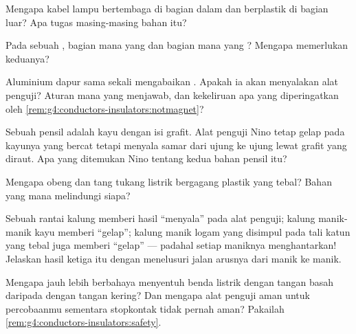 \begin{exercise}[$\star$]\label{exo:g4:conductors-insulators:5}
Mengapa kabel lampu bertembaga di bagian dalam dan berplastik di
bagian luar? Apa tugas masing-masing bahan itu?
\end{exercise}

\begin{exercise}[$\star$]\label{exo:g4:conductors-insulators:6}
Pada sebuah , bagian mana yang  dan bagian mana yang
? Mengapa  memerlukan keduanya?
\end{exercise}

\begin{exercise}[$\star$]\label{exo:g4:conductors-insulators:7}
Aluminium dapur sama sekali mengabaikan . Apakah ia akan
menyalakan  alat penguji? Aturan mana yang menjawab, dan
kekeliruan apa yang diperingatkan oleh
\cref{rem:g4:conductors-insulators:notmagnet}?
\end{exercise}

\begin{exercise}[$\star$]\label{exo:g4:conductors-insulators:8}
Sebuah pensil adalah kayu dengan isi grafit. Alat penguji Nino tetap
gelap pada kayunya yang bercat tetapi menyala samar dari ujung ke
ujung lewat grafit yang diraut. Apa yang ditemukan Nino tentang kedua
bahan pensil itu?
\end{exercise}

\begin{exercise}[$\star$]\label{exo:g4:conductors-insulators:9}
Mengapa obeng dan tang tukang listrik bergagang plastik yang tebal?
Bahan yang mana melindungi siapa?
\end{exercise}

\begin{exercise}[$\star\star$]\label{exo:g4:conductors-insulators:10}
Sebuah rantai kalung memberi hasil ``menyala'' pada alat penguji;
kalung manik-manik kayu memberi ``gelap''; kalung manik logam yang
disimpul pada tali katun yang tebal juga memberi ``gelap'' --- padahal
setiap maniknya menghantarkan! Jelaskan hasil ketiga itu dengan
menelusuri jalan arusnya dari manik ke manik.
\end{exercise}

\begin{exercise}[$\star\star$]\label{exo:g4:conductors-insulators:11}
Mengapa jauh lebih berbahaya menyentuh benda listrik dengan tangan
basah daripada dengan tangan kering? Dan mengapa alat penguji 
aman untuk percobaanmu sementara stopkontak tidak pernah aman?
Pakailah \cref{rem:g4:conductors-insulators:safety}.
\end{exercise}
